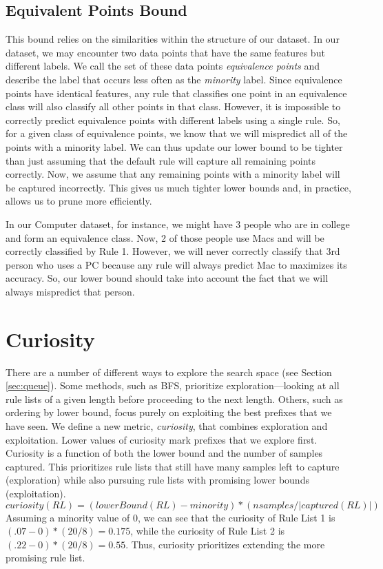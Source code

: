 \subsection{Equivalent Points Bound}
This bound relies on the similarities within the structure of our dataset.
In our dataset, we may encounter two data points that have the same features but different labels.
We call the set of these data points \textit{equivalence points} and describe the label that occurs less often as the \textit{minority} label.
Since equivalence points have identical features, any rule that classifies one point in an equivalence class will also classify all other points in that class.
However, it is impossible to correctly predict equivalence points with different labels using a single rule.
So, for a given class of equivalence points, we know that we will mispredict all of the points with a minority label.
We can thus update our lower bound to be tighter than just assuming that the default rule will capture all remaining points correctly.
Now, we assume that any remaining points with a minority label will be captured incorrectly.
This gives us much tighter lower bounds and, in practice, allows us to prune more efficiently.

In our Computer dataset, for instance, we might have 3 people who are in college and form an equivalence class.
Now, 2 of those people use Macs and will be correctly classified by Rule 1.
However, we will never correctly classify that 3rd person who uses a PC because any rule will always predict Mac to maximizes its accuracy.
So, our lower bound should take into account the fact that we will always mispredict that person.

\section{Curiosity}
\label{def:curiosity}
There are a number of different ways to explore the search space (see Section \ref{sec:queue}).
Some methods, such as BFS, prioritize exploration---looking at all rule lists of a given length before proceeding to the next length.
Others, such as ordering by lower bound, focus purely on exploiting the best prefixes that we have seen.
We define a new metric, \textit{curiosity}, that combines exploration and exploitation.
Lower values of curiosity mark prefixes that we explore first.
Curiosity is a function of both the lower bound and the number of samples captured.
This prioritizes rule lists that still have many samples left to capture (exploration) while also pursuing rule lists with promising lower bounds (exploitation).
$$curiosity(RL) = (lowerBound(RL) - minority)  * (nsamples / |captured(RL)|)$$
Assuming a minority value of 0, we can see that the curiosity of Rule List 1 is $(.07 - 0) * (20 / 8) = 0.175$, while the curiosity of Rule List 2 is $(.22 - 0) * (20 / 8) = 0.55$.
Thus, curiosity prioritizes extending the more promising rule list.

